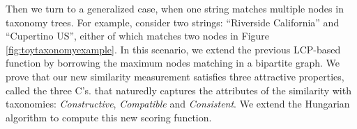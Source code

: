


Then we turn to a generalized case, when one string matches multiple nodes in taxonomy trees.  For example, consider two strings: ``\textsf{Riverside California}'' and ``\textsf{Cupertino US}'', either of which matches two nodes in  Figure \ref{fig:toytaxonomyexample}. In this scenario, we extend the previous LCP-based function by borrowing the maximum nodes matching in a bipartite graph. We prove that our new similarity measurement satisfies three attractive properties, called the three C's. that naturedly captures the attributes of the similarity with taxonomies: \textit{Constructive}, \textit{Compatible} and \textit{Consistent}. We extend the Hungarian algorithm \cite{journals/JSIAM/Munkres57} to compute this new scoring function.




